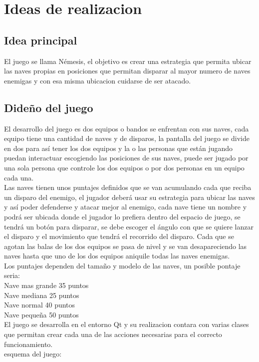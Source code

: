\documentclass{article}
\begin{document}
\section{Ideas de realizacion}
\label{contenido}
\subsection{Idea principal}

El juego se llama Némesis, el objetivo es crear una estrategia que permita ubicar las naves propias en posiciones que permitan disparar al mayor numero de naves enemigas y con esa misma ubicacion cuidarse de ser atacado.

\subsection{Dideño del juego}
El desarrollo del juego es dos equipos o bandos se enfrentan con sus naves, cada equipo tiene una cantidad de naves y de disparos, la pantalla del juego se divide en dos para así tener los dos equipos y la o las personas que están jugando puedan interactuar escogiendo las posiciones de sus naves, puede ser jugado por una sola persona que controle los dos equipos o por dos personas en un equipo cada una.\\
Las naves tienen unos puntajes definidos que se van acumulando cada que reciba un disparo del enemigo, el jugador deberá usar su estrategia para ubicar las naves y así poder defenderse y atacar mejor al enemigo, cada nave tiene un nombre y podrá ser ubicada donde el jugador lo prefiera dentro del espacio de juego, se tendrá un botón para disparar, se debe escoger el ángulo con que se quiere lanzar el disparo y el movimiento que tendrá el recorrido del disparo. Cada que se agotan las balas de los dos equipos se pasa de nivel y se van desapareciendo las naves hasta que uno de los dos equipos aniquile todas las naves enemigas.\\
Los puntajes dependen del tamaño y modelo de las naves, un posible pontaje seria:\\
Nave mas grande 35 puntos\\
Nave mediana 25 puntos\\
Nave normal 40 puntos\\
Nave pequeña 50 puntos\\
El juego se desarrolla en el entorno Qt y su realizacion contara con varias clases que permitan crear cada una de las acciones necesarias para el correcto funcionamiento.\\
esquema del juego: 
\end{document}
